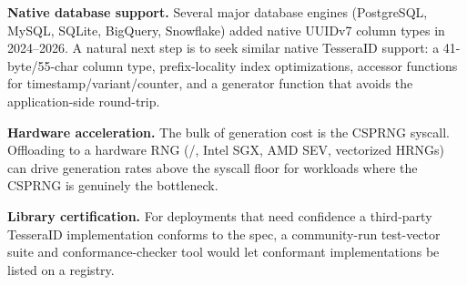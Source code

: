 \textbf{Native database support.} Several major database engines (PostgreSQL, MySQL, SQLite, BigQuery, Snowflake) added native UUIDv7 column types in 2024--2026. A natural next step is to seek similar native TesseraID support: a 41-byte/55-char column type, prefix-locality index optimizations, accessor functions for timestamp/variant/counter, and a generator function that avoids the application-side round-trip.

\textbf{Hardware acceleration.} The bulk of generation cost is the CSPRNG syscall. Offloading to a hardware RNG (/, Intel SGX, AMD SEV, vectorized HRNGs) can drive generation rates above the syscall floor for workloads where the CSPRNG is genuinely the bottleneck.

\textbf{Library certification.} For deployments that need confidence a third-party TesseraID implementation conforms to the spec, a community-run test-vector suite and conformance-checker tool would let conformant implementations be listed on a registry.
